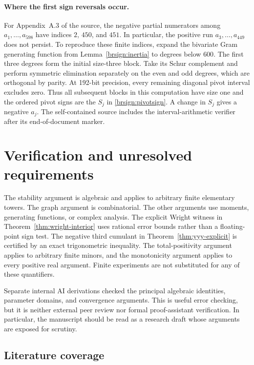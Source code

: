 \documentclass[11pt,a4paper]{article}
\theoremstyle{definition}
\theoremstyle{remark}
\numberwithin{equation}{section}
\begin{document}
\paragraph{Where the first sign reversals occur.}
For Appendix~A.3 of the source, the negative partial numerators among
$a_1,\ldots,a_{598}$ have indices $2$, $450$, and $451$.
In particular, the positive run $a_3,\ldots,a_{449}$ does not persist.
To reproduce these finite indices, expand the bivariate Gram generating
function from Lemma~\ref{brsign:inertia} to degrees below $600$.
The first three degrees form the initial size-three block. Take its
Schur complement and perform symmetric elimination separately on
the even and odd degrees, which are orthogonal by parity. At 192-bit
precision, every remaining diagonal pivot interval excludes zero.
Thus all subsequent blocks in this computation have size one and the
ordered pivot signs are the $S_j$ in \eqref{brsign:pivotsign}. A change
in $S_j$ gives a negative $a_j$. The self-contained source includes
the interval-arithmetic verifier after its end-of-document marker.

\section{Verification and unresolved requirements}
\label{sec:status}

The stability argument is algebraic and applies to arbitrary finite
elementary towers. The graph argument is combinatorial. The other
arguments use moments, generating functions, or complex analysis. The explicit Wright witness in
Theorem~\ref{thm:wright-interior} uses rational error bounds rather than a
floating-point sign test. The negative third cumulant in
Theorem~\ref{thm:yyy-explicit} is certified by an exact trigonometric
inequality. The total-positivity argument applies to arbitrary finite
minors, and the monotonicity argument applies to every positive real
argument. Finite experiments are not substituted for any of these
quantifiers.

Separate internal AI derivations checked the principal algebraic identities,
parameter domains, and convergence arguments. This is useful error checking,
but it is neither external peer review nor formal proof-assistant
verification. In particular, the manuscript should be read as a research
draft whose arguments are exposed for scrutiny.

\subsection{Literature coverage}
\end{document}
